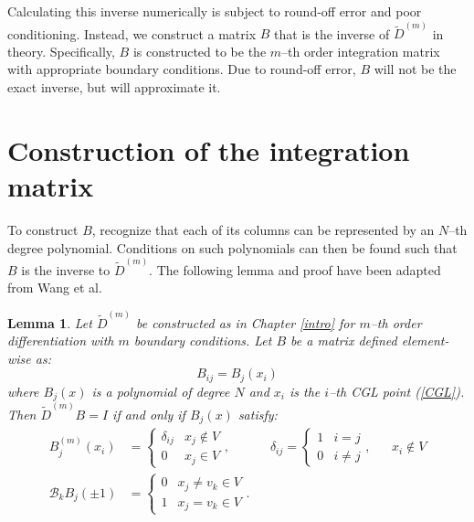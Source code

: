 \documentclass{sfuthesis}
\newtheorem{lemma}{Lemma}
\begin{document}
Calculating this inverse numerically is subject to round-off error and poor conditioning.
Instead, we construct a matrix $B$ that is the inverse of $\tilde{D}^{(m)}$ in theory.
Specifically, $B$ is constructed to be the $m$--th order integration matrix with appropriate boundary conditions.
Due to round-off error, $B$ will not be the exact inverse, but will approximate it.

\section{Construction of the integration matrix}

To construct $B$, recognize that each of its columns can be represented by an $N$--th degree polynomial.
Conditions on such polynomials can then be found such that $B$ is the inverse to $\tilde{D}^{(m)}$.
The following lemma and proof have been adapted from Wang et al. \cite{wang2014well}

\begin{lemma} \label{lemma:PSIM}
Let $\tilde{D}^{(m)}$ be constructed as in Chapter \ref{intro} for $m$--th order differentiation with $m$ boundary conditions.
Let $B$ be a matrix defined element-wise as:
\begin{equation}
B_{ij} = B_j(x_i)
\end{equation}
where $B_j(x)$ is a polynomial of degree $N$ and $x_i$ is the $i$--th CGL point (\ref{CGL}).
Then $\tilde{D}^{(m)} B = I$ if and only if $B_j(x)$ satisfy:
\begin{equation} \label{B conditions}
\begin{aligned}
B^{(m)}_j(x_i) & = \begin{cases} \delta_{ij} & x_j \notin V \\ 0 & x_j \in V \end{cases} , && \delta_{ij} = \begin{cases} 1 & i = j \\ 0 & i \neq j \end{cases}, && x_i \notin V \\
\mathcal{B}_k B_j(\pm 1) & = \begin{cases} 0 & x_j \neq v_k \in V \\ 1 & x_j = v_k \in V \end{cases} .
\end{aligned}
\end{equation}
\end{lemma}
\end{document}
